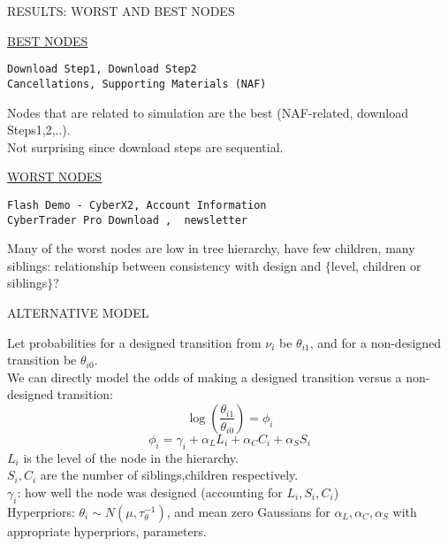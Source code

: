 \documentclass{report}
\newcommand{\head}[1]
{
  \begin{center}
      {\huge {\color{blue} #1}}
    \end{center}
  }
\begin{document}
\newpage \head{RESULTS: WORST AND BEST NODES}
{\LARGE
\underline{BEST NODES}
\begin{verbatim}
Download Step1, Download Step2
Cancellations, Supporting Materials (NAF)
\end{verbatim}
} 
Nodes that are related to simulation are the best (NAF-related, download Steps1,2,..).\\
Not surprising since download steps are sequential.\\
{\LARGE
\underline{WORST NODES}
\begin{verbatim}
Flash Demo - CyberX2, Account Information
CyberTrader Pro Download ,  newsletter
\end{verbatim}
} Many of the worst nodes are low in tree hierarchy, have few
children, many siblings: relationship between consistency with design
and $\{$level, children or siblings$\}$?  

\newpage \head{ALTERNATIVE
  MODEL} Let probabilities for a designed transition from $\nu_i$ be
$\theta_{i1}$, and for a non-designed transition be $\theta_{i0}$.\\
We can directly model the odds of making a designed transition versus
a non-designed transition:
\begin{equation*}
\log\left( \frac{\theta_{i1}}{\theta_{i0}}\right)=\phi_i
\end{equation*}
\begin{equation*}
  \phi_i = \gamma_i + \alpha_L L_i + \alpha_C C_i + \alpha_S S_i 
\end{equation*}
$L_i$ is the level of the node in the hierarchy.\\
$S_i, C_i$ are the number of siblings,children respectively.\\
$\gamma_i$: how well the node was designed (accounting for $L_i,S_i,C_i$)\\
Hyperpriors: $\theta_i
\sim N(\mu,\tau_{\theta}^{-1})$, and mean zero Gaussians for
$\alpha_L,\alpha_C,\alpha_S$ with appropriate hyperpriors, parameters.
\end{document}
